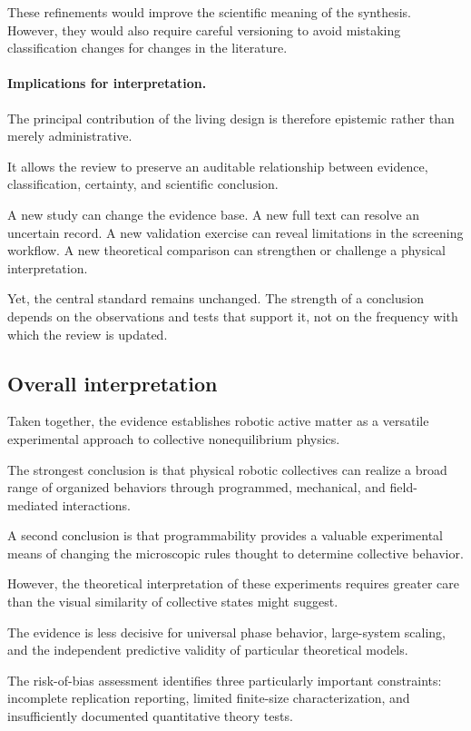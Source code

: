 These refinements
would improve
the scientific
meaning of
the synthesis.
However,
they would
also require
careful versioning
to avoid
mistaking
classification
changes for
changes in
the literature.

\paragraph*{Implications for interpretation.}

The principal contribution of
the living design
is therefore
epistemic rather
than merely
administrative.

It allows
the review
to preserve
an auditable
relationship
between evidence,
classification,
certainty,
and scientific
conclusion.

A new study
can change
the evidence
base.
A new full
text can
resolve an
uncertain
record.
A new
validation exercise
can reveal
limitations in
the screening
workflow.
A new
theoretical comparison
can strengthen
or challenge
a physical
interpretation.

Yet, the
central standard
remains unchanged.
The strength
of a conclusion
depends on
the observations
and tests
that support it,
not on
the frequency
with which
the review
is updated.

\subsection{Overall interpretation}
\label{sec:discussion-overall}

Taken together, the evidence establishes
robotic active matter as a versatile
experimental approach to collective
nonequilibrium physics.

The strongest conclusion is that
physical robotic collectives
can realize a broad range
of organized behaviors
through programmed,
mechanical, and
field-mediated
interactions.

A second conclusion
is that programmability
provides a valuable
experimental means
of changing the
microscopic rules
thought to determine
collective behavior.

However, the theoretical
interpretation of these
experiments requires
greater care than
the visual similarity
of collective states
might suggest.

The evidence is
less decisive
for universal
phase behavior,
large-system scaling,
and the independent
predictive validity
of particular
theoretical models.

The risk-of-bias
assessment identifies
three particularly
important constraints:
incomplete replication
reporting,
limited finite-size
characterization,
and insufficiently
documented quantitative
theory tests.

